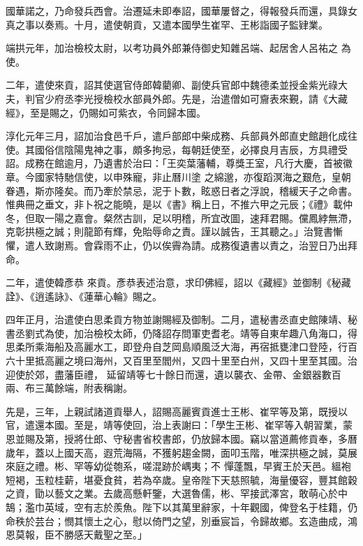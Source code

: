 \begin{pinyinscope}
 國華諾之，乃命發兵西會。治遷延未即奉詔，國華屢督之，得報發兵而還，具錄女真之事以奏焉。十月，遣使朝貢，又遣本國學生崔罕、王彬詣國子監肄業。



 端拱元年，加治檢校太尉，以考功員外郎兼侍御史知雜呂端、起居舍人呂祐之
 為使。



 二年，遣使來貢，詔其使選官侍郎韓藺卿、副使兵官郎中魏德柔並授金紫光祿大夫，判官少府丞李光授檢校水部員外郎。先是，治遣僧如可齎表來覲，請《大藏經》，至是賜之，仍賜如可紫衣，令同歸本國。



 淳化元年三月，詔加治食邑千戶，遣戶部郎中柴成務、兵部員外郎直史館趙化成往使。其國俗信陰陽鬼神之事，頗多拘忌，每朝廷使至，必擇良月吉辰，方具禮受詔。成務在館逾月，乃遺書於治曰：「王奕葉藩輔，尊獎王室，凡行大慶，首被徽章。今國家特馳信使，以申殊寵，非止曆川塗
 之綿邈，亦復蹈溟海之艱危，皇朝眷遇，斯亦隆矣。而乃牽於禁忌，泥于卜數，眩惑日者之浮說，稽緩天子之命書。惟典冊之垂文，非卜祝之能曉，是以《書》稱上日，不推六甲之元辰；《禮》載仲冬，但取一陽之嘉會。粲然古訓，足以明稽，所宜改圖，速拜君賜。儻鳳綍無滯，克彰拱極之誠；則龍節有輝，免貽辱命之責。謹以誠告，王其聽之。」治覽書慚懼，遣人致謝焉。會霖雨不止，仍以俟霽為請。成務復遺書以責之，治翌日乃出拜命。



 二年，遣使韓彥恭
 來貢。彥恭表述治意，求印佛經，詔以《藏經》並御制《秘藏詮》、《逍遙詠》、《蓮華心輪》賜之。



 四年正月，治遣使白思柔貢方物並謝賜經及御制。二月，遣秘書丞直史館陳靖、秘書丞劉式為使，加治檢校太師，仍降詔存問軍吏耆老。靖等自東牟趣八角海口，得思柔所乘海船及高麗水工，即登舟自芝岡島順風泛大海，再宿抵甕津口登陸，行百六十里抵高麗之境曰海州，又百里至閻州，又四十里至白州，又四十里至其國。治迎使於郊，盡藩臣禮，
 延留靖等七十餘日而還，遺以襲衣、金帶、金銀器數百兩、布三萬餘端，附表稱謝。



 先是，三年，上親試諸道貢舉人，詔賜高麗賓貢進士王彬、崔罕等及第，既授以官，遣還本國。至是，靖等使回，治上表謝曰：「學生王彬、崔罕等入朝習業，蒙恩並賜及第，授將仕郎、守秘書省校書郎，仍放歸本國。竊以當道薦修貢奉，多曆歲年，蓋以上國天高，遐荒海隔，不獲躬趨金闕，面叩玉階，唯深拱極之誠，莫展來庭之禮。彬、罕等幼從匏系，嗟混跡於嵎夷；不
 憚蓬飄，早賓王於天邑。縕袍短褐，玉粒桂薪，堪憂食貧，若為卒歲。皇帝陛下天慈照毓，海量優容，豐其館穀之資，勖以藝文之業。去歲高懸軒鑒，大選魯儒，彬、罕接武澤宮，敢萌心於中鵠；濫巾英域，空有志於羨魚。陛下以其萬里辭家，十年觀國，俾登名于桂籍，仍命秩於芸台；憫其懷土之心，慰以倚門之望，別垂宸旨，令歸故鄉。玄造曲成，鴻恩莫報，臣不勝感天戴聖之至。」




\end{pinyinscope}

